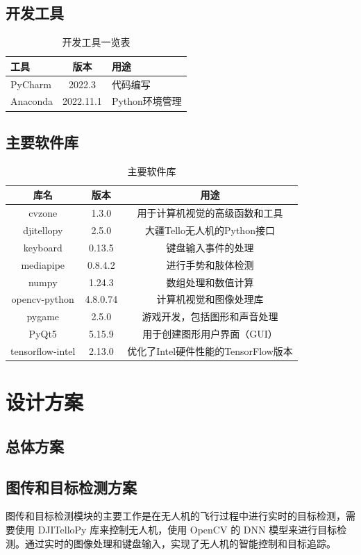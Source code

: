 \documentclass[report, twoside, UTF8, AutoFakeBold = 1, AutoFakeSlant, zihao = -4]{config}
\begin{document}
\section{开发工具}
\begin{table}[H]
  \centering
  \caption{开发工具一览表}
  \label{tab:dev-tool}
  \begin{tabular}{@{}lcl@{}}
    \toprule[1.5pt]
    工具 & 版本 & 用途 \\ \midrule[0.8pt]
    PyCharm & 2022.3 & 代码编写 \\ 
    Anaconda & 2022.11.1 & Python环境管理 \\ \bottomrule[1.5pt]
  \end{tabular}
\end{table}

\section{主要软件库}
\begin{table}[h]
\centering
\caption{主要软件库}
\renewcommand\arraystretch{1.2} %
\begin{tabular}{|c|c|c|}
\hline
库名 & 版本 & 用途 \\
\hline
cvzone & 1.3.0 & 用于计算机视觉的高级函数和工具 \\
djitellopy & 2.5.0 & 大疆Tello无人机的Python接口 \\
keyboard & 0.13.5 & 键盘输入事件的处理 \\
mediapipe & 0.8.4.2 & 进行手势和肢体检测 \\
numpy & 1.24.3 & 数组处理和数值计算 \\
opencv-python & 4.8.0.74 & 计算机视觉和图像处理库 \\
pygame & 2.5.0 & 游戏开发，包括图形和声音处理 \\
PyQt5 & 5.15.9 & 用于创建图形用户界面（GUI） \\
tensorflow-intel & 2.13.0 & 优化了Intel硬件性能的TensorFlow版本 \\
\hline
\end{tabular}
\end{table}

\chapter{设计方案}
\section{总体方案}
\section{图传和目标检测方案}
图传和目标检测模块的主要工作是在无人机的飞行过程中进行实时的目标检测，需要使用 DJITelloPy 库来控制无人机，使用 OpenCV 的 DNN 模型来进行目标检测。通过实时的图像处理和键盘输入，实现了无人机的智能控制和目标追踪。
\end{document}
